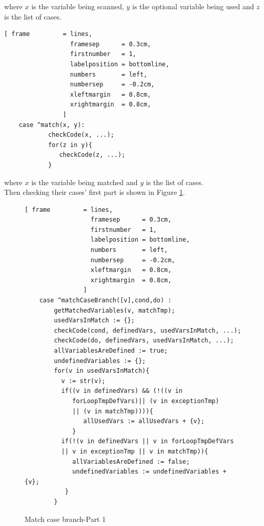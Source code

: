 \documentclass[11pt]{report}
\begin{document}
where $x$ is the variable being scanned, $y$ is the optional variable being used and $z$ is the list of cases.
\begin{Verbatim}[ frame         = lines, 
                  framesep      = 0.3cm, 
                  firstnumber   = 1,
                  labelposition = bottomline,
                  numbers       = left,
                  numbersep     = -0.2cm,
                  xleftmargin   = 0.8cm,
                  xrightmargin  = 0.8cm,
                ]
    case ^match(x, y): 
    		checkCode(x, ...);
	    	for(z in y){
	       	   checkCode(z, ...);
	    	} 
\end{Verbatim}
where $x$ is the variable being matched and $y$ is the list of cases.
\\

Then checking their cases' first part is shown in Figure \ref{fig:matchCaseBranch-part1}.
\begin{figure}[!htb]
\centering
\begin{Verbatim}[ frame         = lines, 
                  framesep      = 0.3cm, 
                  firstnumber   = 1,
                  labelposition = bottomline,
                  numbers       = left,
                  numbersep     = -0.2cm,
                  xleftmargin   = 0.8cm,
                  xrightmargin  = 0.8cm,
                ]
    case ^matchCaseBranch([v],cond,do) : 
		getMatchedVariables(v, matchTmp);
		usedVarsInMatch := {};
		checkCode(cond, definedVars, usedVarsInMatch, ...);
		checkCode(do, definedVars, usedVarsInMatch, ...);
		allVariablesAreDefined := true;
		undefinedVariables := {};
		for(v in usedVarsInMatch){
   		  v := str(v);
   		  if((v in definedVars) && (!((v in 
   		     forLoopTmpDefVars)|| (v in exceptionTmp) 
   		     || (v in matchTmp)))){
      	     	allUsedVars := allUsedVars + {v};
		     }
   		  if(!(v in definedVars || v in forLoopTmpDefVars 
   		  || v in exceptionTmp || v in matchTmp)){
      		 allVariablesAreDefined := false;
      		 undefinedVariables := undefinedVariables + {v};
  		   }
		}
\end{Verbatim}
\vspace*{-0.3cm}
\caption{Match case branch-Part 1}
\label{fig:matchCaseBranch-part1}
\end{figure}
\end{document}
